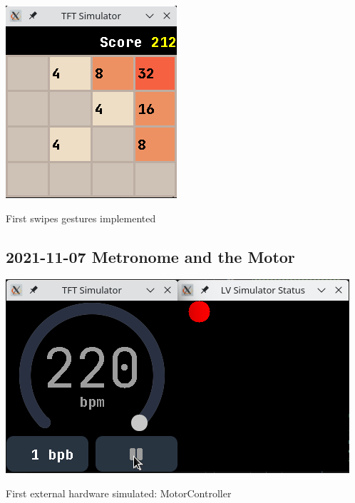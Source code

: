 \documentclass{beamer}
\begin{document}
\begin{frame}{}
  \centering
  \includegraphics[height=0.8\paperheight]{../2021-11-03_Twos_first_sim.png}

  First swipes gestures implemented
\end{frame}


\subsection{2021-11-07 Metronome and the Motor}
\begin{frame}{}
  \centering\includegraphics[width=\textwidth]{../2021-11-07_metronome_and_motor_status.png}

  First external hardware simulated: MotorController
\end{frame}
\end{document}
